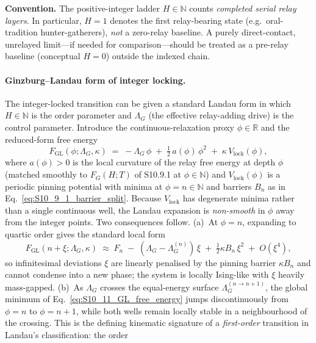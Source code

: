 \documentclass[11pt]{article}
\begin{document}
\noindent\textbf{Convention.}\enspace
The positive-integer ladder $H\in\mathbb{N}$ counts \emph{completed serial relay layers}.
In particular, $H=1$ denotes the first relay-bearing state (e.g.\ oral-tradition
hunter-gatherers), \emph{not} a zero-relay baseline.
A purely direct-contact, unrelayed limit---if needed for comparison---should be
treated as a pre-relay baseline (conceptual $H=0$) outside the indexed chain.

\paragraph{Ginzburg--Landau form of integer locking.}
The integer-locked transition can be given a standard Landau form in which
$H\in\mathbb{N}$ is the order parameter and $\Lambda_G$ (the effective
relay-adding drive) is the control parameter.  Introduce the
continuous-relaxation proxy $\phi\in\mathbb{R}$ and the reduced-form free energy
\begin{equation}
F_{\mathrm{GL}}(\phi;\Lambda_G,\kappa)
\;=\;
-\Lambda_G\,\phi
\;+\;\tfrac{1}{2}\,a(\phi)\,\phi^2
\;+\;\kappa\,V_{\mathrm{lock}}(\phi),
\label{eq:S10_11_GL_free_energy}
\end{equation}
where $a(\phi)>0$ is the local curvature of the relay free energy at depth
$\phi$ (matched smoothly to $F_G(H;T)$ of S10.9.1 at $\phi\in\mathbb{N}$)
and $V_{\mathrm{lock}}(\phi)$ is a periodic pinning potential with minima at
$\phi=n\in\mathbb{N}$ and barriers $B_n$ as in
Eq.~\eqref{eq:S10_9_1_barrier_split}.  Because $V_{\mathrm{lock}}$ has
degenerate minima rather than a single continuous well, the Landau expansion
is \emph{non-smooth} in $\phi$ away from the integer points.  Two
consequences follow.  (a)~At $\phi=n$, expanding to quartic order gives the
standard local form
\[
F_{\mathrm{GL}}(n+\xi;\Lambda_G,\kappa)\;\approx\;
F_n\;-\;(\Lambda_G-\Lambda_G^{(n)})\,\xi
\;+\;\tfrac{1}{2}\kappa B_n\,\xi^2
\;+\;O(\xi^4),
\]
so infinitesimal deviations $\xi$ are linearly penalised by the pinning
barrier $\kappa B_n$ and cannot condense into a new phase;
the system is locally Ising-like with $\xi$ heavily mass-gapped.
(b)~As $\Lambda_G$ crosses the equal-energy surface
$\Lambda_G^{(n\to n+1)}$, the global minimum of
Eq.~\eqref{eq:S10_11_GL_free_energy} jumps discontinuously from $\phi=n$
to $\phi=n+1$, while both wells remain locally stable in a neighbourhood
of the crossing.  This is the defining kinematic signature of a
\emph{first-order} transition in Landau's classification: the order
\end{document}
